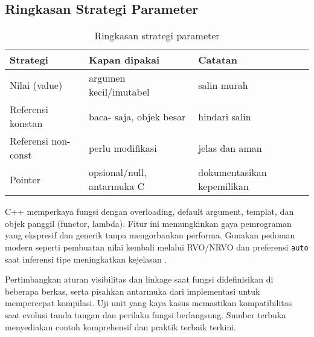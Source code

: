 \documentclass[../main.tex]{subfiles}
\begin{document}
\subsection{Ringkasan Strategi Parameter}
\begin{table}[h]
  \centering
  \caption{Ringkasan strategi parameter}
  \begin{tabular}{@{}lll@{}}
    \toprule
    Strategi & Kapan dipakai & Catatan \\
    \midrule
    Nilai (value) & argumen kecil/imutabel & salin murah \\
    Referensi konstan & baca- saja, objek besar & hindari salin \\
    Referensi non-const & perlu modifikasi & jelas dan aman \\
    Pointer & opsional/null, antarmuka C & dokumentasikan kepemilikan \\
    \bottomrule
  \end{tabular}
\end{table}
C++ memperkaya fungsi dengan overloading, default argument, templat, dan objek panggil (functor, lambda). Fitur ini memungkinkan gaya pemrograman yang ekspresif dan generik tanpa mengorbankan performa. Gunakan pedoman modern seperti pembuatan nilai kembali melalui RVO/NRVO dan preferensi \texttt{auto} saat inferensi tipe meningkatkan kejelasan \parencite{cpp-functions,cpp-reference}.

Pertimbangkan aturan visibilitas dan linkage saat fungsi didefinisikan di beberapa berkas, serta pisahkan antarmuka dari implementasi untuk mempercepat kompilasi. Uji unit yang kaya kasus memastikan kompatibilitas saat evolusi tanda tangan dan perilaku fungsi berlangsung. Sumber terbuka menyediakan contoh komprehensif dan praktik terbaik terkini.
\end{document}
